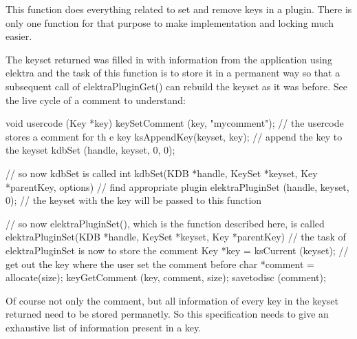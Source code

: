 This function does everything related to set and remove keys in a plugin. There is only one function for that purpose to make implementation and locking much easier.

The keyset {\ttfamily returned} was filled in with information from the application using elektra and the task of this function is to store it in a permanent way so that a subsequent call of elektraPluginGet() can rebuild the keyset as it was before. See the live cycle of a comment to understand: 
\begin{DoxyCode}
void usercode (Key *key)
{
        keySetComment (key, "mycomment"); // the usercode stores a comment for th
      e key
        ksAppendKey(keyset, key); // append the key to the keyset
        kdbSet (handle, keyset, 0, 0);
}

// so now kdbSet is called
int kdbSet(KDB *handle, KeySet *keyset, Key *parentKey, options)
{
        // find appropriate plugin
        elektraPluginSet (handle, keyset, 0); // the keyset with the key will be 
      passed to this function
}

// so now elektraPluginSet(), which is the function described here, is called
elektraPluginSet(KDB *handle, KeySet *keyset, Key *parentKey)
{
        // the task of elektraPluginSet is now to store the comment
        Key *key = ksCurrent (keyset); // get out the key where the user set the 
      comment before
        char *comment = allocate(size);
        keyGetComment (key, comment, size);
        savetodisc (comment);
}
\end{DoxyCode}
 Of course not only the comment, but all information of every key in the keyset {\ttfamily returned} need to be stored permanetly. So this specification needs to give an exhaustive list of information present in a key.

